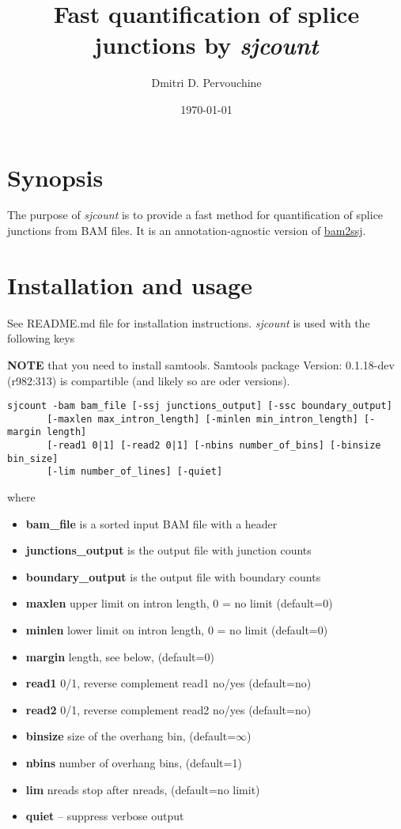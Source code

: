 \documentclass{article}
\begin{document}
\title{Fast quantification of splice junctions by {\em sjcount}}
\author{Dmitri D. Pervouchine}
\date{\today}
\maketitle

\section{Synopsis}

The purpose of {\em sjcount} is to provide a fast method for quantification of splice junctions from BAM files. It is an annotation-agnostic version of 
\href{https://github.com/pervouchine/bam2ssj}{bam2ssj}.


\section{Installation and usage}

See README.md file for installation instructions. {\em sjcount} is used with the following keys

{\bf NOTE} that you need to install samtools.
Samtools package Version: 0.1.18-dev (r982:313) is compartible (and likely so are oder versions).

\begin{verbatim}
sjcount -bam bam_file [-ssj junctions_output] [-ssc boundary_output]
       [-maxlen max_intron_length] [-minlen min_intron_length] [-margin length] 
       [-read1 0|1] [-read2 0|1] [-nbins number_of_bins] [-binsize bin_size] 
       [-lim number_of_lines] [-quiet]
\end{verbatim}
where
\begin{itemize}
\item {\bf bam\_file} is a sorted input BAM file with a header
\item {\bf junctions\_output} is the output file with junction counts
\item {\bf boundary\_output} is the output file with boundary counts
\item {\bf maxlen} upper limit on intron length, 0 = no limit (default=0)
\item {\bf minlen} lower limit on intron length, 0 = no limit (default=0)
\item {\bf margin} length, see below, (default=0)
\item {\bf read1} 0/1, reverse complement read1 no/yes (default=no)
\item {\bf read2} 0/1, reverse complement read2 no/yes (default=no)
\item {\bf binsize} size of the overhang bin, (default=$\infty$)
\item {\bf nbins} number of overhang bins, (default=1)
\item {\bf lim} nreads stop after nreads, (default=no limit)
\item {\bf quiet} -- suppress verbose output
\end{itemize}
\end{document}
